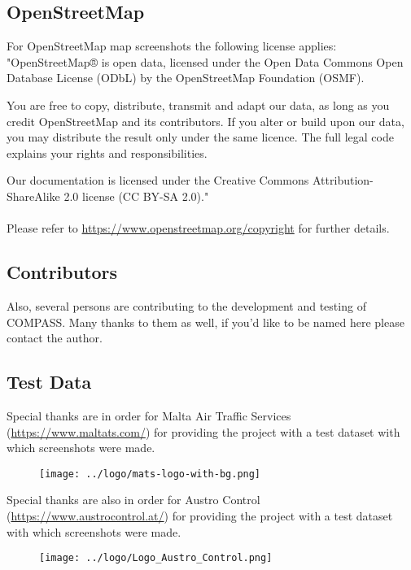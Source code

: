 \subsection{OpenStreetMap}

For OpenStreetMap map screenshots the following license applies: \\
"OpenStreetMap® is open data, licensed under the Open Data Commons Open Database License (ODbL) by the OpenStreetMap Foundation (OSMF).

You are free to copy, distribute, transmit and adapt our data, as long as you credit OpenStreetMap and its contributors. If you alter or build upon our data, you may distribute the result only under the same licence. The full legal code explains your rights and responsibilities.

Our documentation is licensed under the Creative Commons Attribution-ShareAlike 2.0 license (CC BY-SA 2.0)." \\\\

Please refer to \href{https://www.openstreetmap.org/copyright}{https://www.openstreetmap.org/copyright} for further details.


\subsection{Contributors}

Also, several persons are contributing to the development and testing of COMPASS. Many thanks to them as well, if you'd like to be named here please contact the author.

\subsection{Test Data}

Special thanks are in order for Malta Air Traffic Services (\url{https://www.maltats.com/}) for providing the project with a test dataset with which screenshots were made. \\

\begin{figure}[H]
  \center
    \texttt{[image: ../logo/mats-logo-with-bg.png]}
\end{figure}

Special thanks are also in order for Austro Control (\url{https://www.austrocontrol.at/}) for providing the project with a test dataset with which screenshots were made. \\

\begin{figure}[H]
  \center
    \texttt{[image: ../logo/Logo\_Austro\_Control.png]}
\end{figure}



